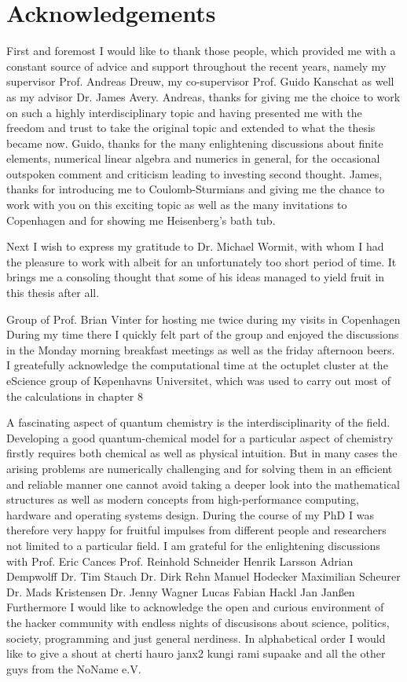 \chapter*{Acknowledgements}
{}

First and foremost I would like to thank those people,
which provided me with a constant source of advice and support
throughout the recent years,
namely my supervisor Prof. Andreas Dreuw,
my co-supervisor Prof. Guido Kanschat
as well as my advisor Dr. James Avery.
Andreas, thanks for giving me the choice to work on such
a highly interdisciplinary topic
and having presented me with the freedom and trust
to take the original topic and extended to what the thesis became now.
Guido, thanks for the many enlightening discussions
about finite elements,
numerical linear algebra and numerics in general,
for the occasional outspoken comment and criticism
leading to investing second thought.
James, thanks for introducing me to Coulomb-Sturmians
and giving me the chance to work with you on this
exciting topic
as well as the many invitations to Copenhagen
and for showing me Heisenberg's bath tub.

Next I wish to express my gratitude to Dr. Michael Wormit,
with whom I had the pleasure to work with
albeit for an unfortunately too short period of time.
It brings me a consoling thought that some of his
ideas managed to yield fruit in this thesis after all.

Group of Prof. Brian Vinter for hosting me twice
during my visits in Copenhagen
During my time there I quickly felt part of the group
and enjoyed the discussions in the Monday morning breakfast meetings
as well as the friday afternoon beers.
I greatefully acknowledge the computational time at the octuplet cluster at
the eScience group of Køpenhavns Universitet, which was used to carry out
most of the calculations in chapter 8

A fascinating aspect of quantum chemistry is the interdisciplinarity of the field.
Developing a good quantum-chemical model for a particular aspect of chemistry
firstly requires both chemical as well as physical intuition.
But in many cases the arising problems are numerically challenging
and for solving them in an efficient and reliable manner
one cannot avoid taking a deeper look into the mathematical structures
as well as modern concepts from high-performance computing,
hardware and operating systems design.
During the course of my PhD I was therefore very
happy for fruitful impulses from different people and researchers
not limited to a particular field.
I am grateful for the enlightening discussions with
Prof. Eric Cances
Prof. Reinhold Schneider
Henrik Larsson
Adrian Dempwolff
Dr. Tim Stauch
Dr. Dirk Rehn
Manuel Hodecker
Maximilian Scheurer
Dr. Mads Kristensen
Dr. Jenny Wagner
Lucas Fabian Hackl
Jan Janßen
Furthermore I would like to acknowledge the open and curious
environment of the hacker community with endless nights
of discusisons about science, politics,
society, programming and just general nerdiness.
In alphabetical order I would like to give a shout at 
cherti
hauro
janx2
kungi
rami
supaake
and all the other guys from the NoName e.V.

